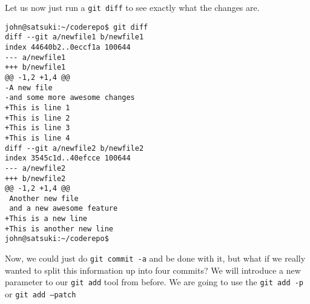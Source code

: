 Let us now just run a \texttt{git diff} to see exactly what the changes are.

\begin{Verbatim}[frame=leftline,framerule=1mm,fontsize=\relsize{-3}] 
john@satsuki:~/coderepo$ git diff
diff --git a/newfile1 b/newfile1
index 44640b2..0eccf1a 100644
--- a/newfile1
+++ b/newfile1
@@ -1,2 +1,4 @@
-A new file
-and some more awesome changes
+This is line 1
+This is line 2
+This is line 3
+This is line 4
diff --git a/newfile2 b/newfile2
index 3545c1d..40efcce 100644
--- a/newfile2
+++ b/newfile2
@@ -1,2 +1,4 @@
 Another new file
 and a new awesome feature
+This is a new line
+This is another new line
john@satsuki:~/coderepo$ 
\end{Verbatim}

Now, we could just do \texttt{git commit -a} and be done with it, but what if we really wanted to split this information up into four commits?  We will introduce a new parameter to our \texttt{git add} tool from before.  We are going to use the \texttt{git add -p} or \texttt{git add --patch}
